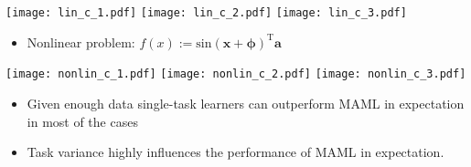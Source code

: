 \documentclass[a0paper,portrait]{baposter}
\begin{document}
\begin{poster}
{\begin{itemize}
  \end{itemize}

  \begin{center}
  \texttt{[image: lin\_c\_1.pdf]}%
  \texttt{[image: lin\_c\_2.pdf]}
  \texttt{[image: lin\_c\_3.pdf]}
  \end{center}

  \begin{itemize}
    \color{Pink} \item \color{Black} Nonlinear problem: $f(x):=\text{sin}(\mathbf{x}+\boldsymbol{\phi})^{\text{T}}\mathbf{a}$

  \end{itemize}

  \begin{center}
  \texttt{[image: nonlin\_c\_1.pdf]}%
  \texttt{[image: nonlin\_c\_2.pdf]}
  \texttt{[image: nonlin\_c\_3.pdf]}
  \end{center}

}

{
  \begin{itemize}
    \color{Pink} \item \color{Black} Given enough data single-task learners can outperform MAML in expectation in most of the cases
    \color{Pink} \item \color{Black} Task variance highly influences the performance of MAML in expectation.
  \end{itemize}
}



\end{poster}
\end{document}
